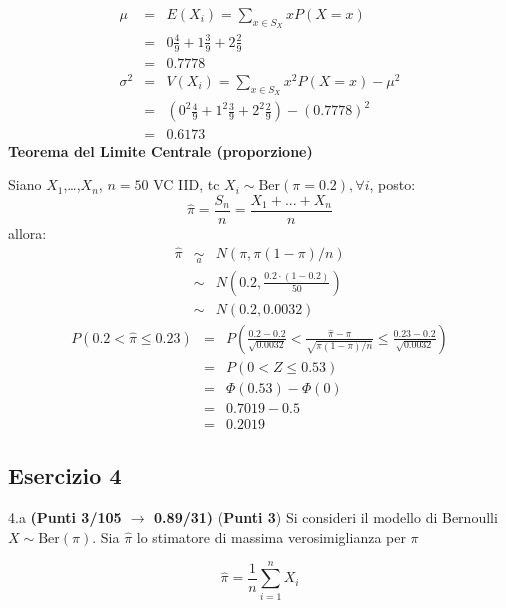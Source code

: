 \documentclass[
  11pt,
]{book}
\theoremstyle{mytheoremstyle}
\theoremstyle{mydefstyle}
\newenvironment{sol}
  {
  \begin{tcolorbox}[enhanced,breakable,arc=0.1mm,boxrule=1pt,colback=white,colframe=iblue,
  title=\bf \fontfamily{lmss}\selectfont \hspace{.5 cm} Soluzione,drop fuzzy shadow]

}{
\end{tcolorbox}
  }
\begin{document}
\begin{sol}
\begin{eqnarray*} \mu &=& E(X_i) = \sum_{x\in S_X}x P(X=x)\\ 
 &=&  0  \frac { 4 }{ 9 }+ 1  \frac { 3 }{ 9 }+ 2  \frac { 2 }{ 9 } \\ 
            &=& 0.7778 \\ 
 \sigma^2 &=& V(X_i) = \sum_{x\in S_X}x^2 P(X=x)-\mu^2\\ 
 &=&\left(  0  ^2\frac { 4 }{ 9 }+ 1  ^2\frac { 3 }{ 9 }+ 2  ^2\frac { 2 }{ 9 } \right)-( 0.7778 )^2\\ 
            &=& 0.6173 
\end{eqnarray*}
\textbf{Teorema del Limite Centrale (proporzione)}

Siano \(X_1\),\ldots,\(X_n\), \(n=50\) VC IID, tc \(X_i\sim\text{Ber}(\pi=0.2)\)\(,\forall i\), posto:
\[
      \hat\pi=\frac{S_n}n = \frac{X_1 + ... + X_n}n
      \]
allora:\begin{eqnarray*}
  \hat\pi & \mathop{\sim}\limits_{a}& N(\pi,\pi(1-\pi)/n) \\
  &\sim & N\left(0.2,\frac{0.2\cdot(1-0.2)}{50}\right) \\
     &\sim & N(0.2,0.0032) 
  \end{eqnarray*}\begin{eqnarray*}
   P( 0.2 < \hat\pi \leq  0.23 ) &=& P\left( \frac { 0.2  -  0.2 }{\sqrt{ 0.0032 }} < \frac { \hat\pi  -  \pi }{ \sqrt{\pi(1-\pi)/n} } \leq \frac { 0.23  -  0.2 }{\sqrt{ 0.0032 }}\right)  \\
              &=& P\left(  0  < Z \leq  0.53 \right) \\
              &=& \Phi( 0.53 )-\Phi( 0 )\\
              &=&  0.7019 - 0.5 \\ 
              &=&  0.2019 
   \end{eqnarray*}

\end{sol}

\subsection{Esercizio 4}\label{esercizio-4-38}

4.a \textbf{(Punti 3/105 \(\rightarrow\) 0.89/31)} (\textbf{Punti 3}) Si consideri il modello di Bernoulli \(X\sim\text{Ber}(\pi)\). Sia \(\hat\pi\) lo stimatore di massima verosimiglianza per \(\pi\)

\[
  \hat\pi = \frac 1n \sum_{i=1}^n X_i
\]
\end{document}

